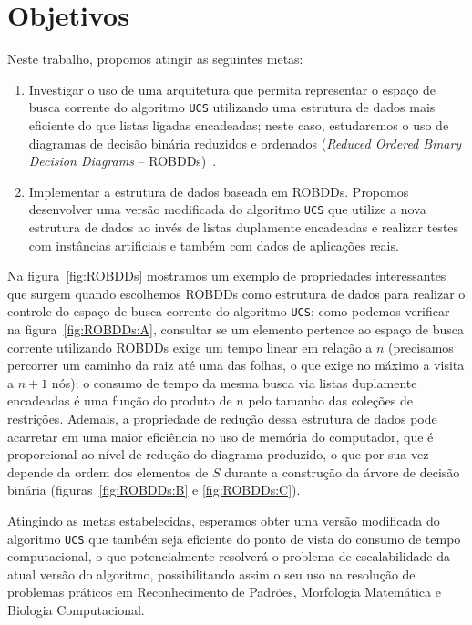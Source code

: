 \documentclass[12pt]{article}
\begin{document}
\newpage

\section{Objetivos}

Neste trabalho, propomos atingir as seguintes metas:

\begin{enumerate}

  \item Investigar o uso de uma arquitetura que permita representar o espaço de busca corrente do algoritmo {\tt UCS} utilizando uma estrutura de dados mais eficiente do que listas ligadas encadeadas; neste caso, estudaremos o uso de diagramas de decisão binária reduzidos e ordenados ({\em Reduced Ordered Binary Decision Diagrams} -- ROBDDs)~\cite{bryant}. 
  
  \item Implementar a estrutura de dados baseada em ROBDDs. Propomos desenvolver uma versão modificada do algoritmo {\tt UCS} que utilize a nova estrutura de dados ao invés de listas duplamente encadeadas e realizar testes com instâncias artificiais e também com dados de aplicações reais.
  

\end{enumerate}

Na figura~\ref{fig:ROBDDs} mostramos um exemplo de propriedades interessantes que surgem quando escolhemos ROBDDs como estrutura de dados para realizar o controle do espaço de busca corrente do algoritmo {\tt UCS}; como podemos verificar na figura~\ref{fig:ROBDDs:A}, consultar se um elemento pertence ao espaço de busca corrente utilizando ROBDDs exige um tempo linear em relação a $n$ (precisamos percorrer um caminho da raiz até uma das folhas, o que exige no máximo a visita a $n + 1$ nós); o consumo de tempo da mesma busca via listas duplamente encadeadas é uma função do produto de $n$ pelo tamanho das coleções de restrições. Ademais, a propriedade de redução dessa estrutura de dados pode acarretar em uma maior eficiência no uso de memória do computador, que é proporcional ao nível de redução do diagrama produzido, o que por sua vez depende da ordem dos elementos de $S$ durante a construção da árvore de decisão binária (figuras~\ref{fig:ROBDDs:B} e \ref{fig:ROBDDs:C}).

Atingindo as metas estabelecidas, esperamos obter uma versão modificada do algoritmo {\tt UCS} que também seja eficiente do ponto de vista do consumo de tempo computacional, o que potencialmente resolverá o problema de escalabilidade da atual versão do algoritmo, possibilitando assim o seu uso na resolução de problemas práticos em Reconhecimento de Padrões, Morfologia Matemática e Biologia Computacional.
\end{document}
